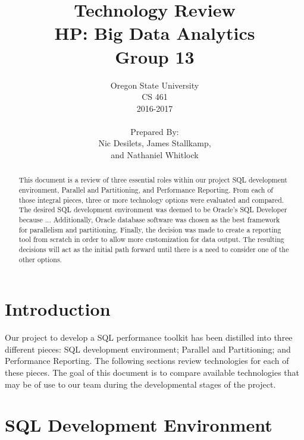 \documentclass[draftclsnofoot, onecolumn, compsoc, 10pt]{IEEEtran}
\title{\Huge Technology Review\\\large HP: Big Data Analytics\\Group 13}
\author{Oregon State University\\CS 461\\2016-2017\\\\Prepared By:\\Nic Desilets, James Stallkamp,\\and Nathaniel Whitlock}
\begin{document}
\begin{titlingpage}
    \maketitle 
    
    \vspace{1in}
    \begin{abstract}
		\noindent This document is a review of three essential roles within our project SQL development environment, Parallel and Partitioning, and Performance Reporting.
        From each of those integral pieces, three or more technology options were evaluated and compared.
        The desired SQL development environment was deemed to be Oracle's SQL Developer because ...
        Additionally, Oracle database software was chosen as the best framework for parallelism and partitioning.
        Finally, the decision was made to create a reporting tool from scratch in order to allow more customization for data output.
        The resulting decisions will act as the initial path forward until there is a need to consider one of the other options.
    \end{abstract}
\end{titlingpage}

\tableofcontents
\pagebreak

\section{Introduction}
Our project to develop a SQL performance toolkit has been distilled into three different pieces: SQL development environment; Parallel and Partitioning; and Performance Reporting. The following sections review technologies for each of these pieces. The goal of this document is to compare available technologies that may be of use to our team during the developmental stages of the project.

\section{SQL Development Environment}
\end{document}
